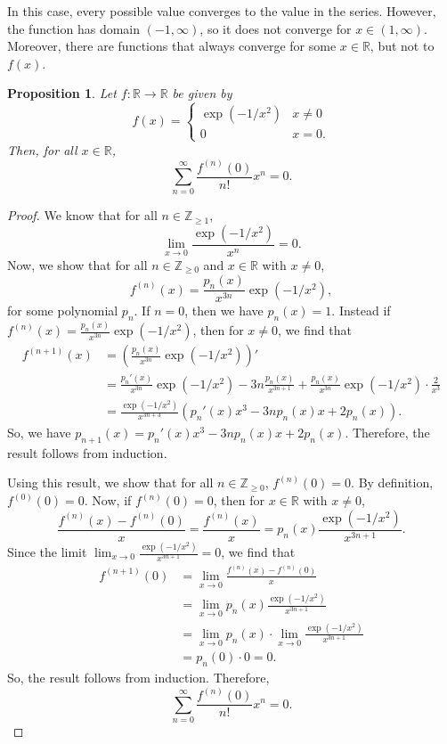 \documentclass[a4paper, openany]{memoir}
\theoremstyle{definition}
\theoremstyle{plain}
\newtheorem{proposition}[definition]{Proposition}
\begin{document}
\noindent In this case, every possible value converges to the value in the series. However, the function has domain $(-1, \infty)$, so it does not converge for $x \in (1, \infty)$. Moreover, there are functions that always converge for some $x \in \mathbb{R}$, but not to $f(x)$.
\begin{proposition}
Let $f: \mathbb{R} \to \mathbb{R}$ be given by
\[f(x) = \begin{cases}
\exp(-1/x^2) & x \neq 0 \\
0 & x = 0.
\end{cases}\]
Then, for all $x \in \mathbb{R}$,
\[\sum_{n=0}^{\infty} \frac{f^{(n)}(0)}{n!} x^n = 0.\]
\end{proposition}
\begin{proof}
We know that for all $n \in \mathbb{Z}_{\geqslant 1}$,
\[\lim_{x \to 0} \frac{\exp(-1/x^2)}{x^n} = 0.\]
Now, we show that for all $n \in \mathbb{Z}_{\geqslant 0}$ and $x \in \mathbb{R}$ with $x \neq 0$, 
\[f^{(n)}(x) = \frac{p_n(x)}{x^{3n}} \exp(-1/x^2),\]
for some polynomial $p_n$. If $n = 0$, then we have $p_n(x) = 1$. Instead if 
$f^{(n)}(x) = \frac{p_n(x)}{x^{3n}} \exp(-1/x^2)$, then for $x \neq 0$, we find that
\begin{align*}
    f^{(n+1)}(x) &= \left(\frac{p_n(x)}{x^{3n}} \exp(-1/x^2)\right)' \\
    &= \frac{p_n'(x)}{x^{3n}} \exp(-1/x^2) - 3n \frac{p_n(x)}{x^{3n+1}} + \frac{p_n(x)}{x^{3n}} \exp(-1/x^2) \cdot \frac{2}{x^3} \\
    &= \frac{\exp(-1/x^2)}{x^{3n+3}} \left(p_n'(x)x^3 - 3n p_n(x) x + 2p_n(x)\right).
\end{align*}
So, we have $p_{n+1}(x) = p_n'(x)x^3 - 3n p_n(x) x + 2p_n(x)$. Therefore, the result follows from induction.

\noindent Using this result, we show that for all $n \in \mathbb{Z}_{\geqslant 0}$, $f^{(n)}(0) = 0$. By definition, $f^{(0)}(0) = 0$. Now, if $f^{(n)}(0) = 0$, then for $x \in \mathbb{R}$ with $x \neq 0$,
\[\frac{f^{(n)}(x) - f^{(n)}(0)}{x} = \frac{f^{(n)}(x)}{x} = p_n(x) \frac{\exp(-1/x^2)}{x^{3n+1}}.\]
Since the limit $\lim_{x \to 0} \frac{\exp(-1/x^2)}{x^{3n+1}} = 0$, we find that
\begin{align*}
    f^{(n+1)}(0) &= \lim_{x \to 0} \frac{f^{(n)}(x) - f^{(n)}(0)}{x} \\
    &= \lim_{x \to 0} p_n(x) \frac{\exp(-1/x^2)}{x^{3n+1}} \\
    &= \lim_{x \to 0} p_n(x) \cdot \lim_{x \to 0} \frac{\exp(-1/x^2)}{x^{3n+1}} \\
    &= p_n(0) \cdot 0 = 0.
\end{align*}
So, the result follows from induction. Therefore,
\[\sum_{n=0}^{\infty} \frac{f^{(n)}(0)}{n!} x^n = 0.\]
\end{proof}
\end{document}
